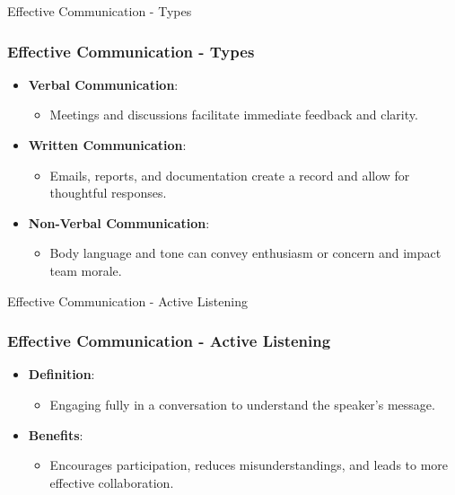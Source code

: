 \documentclass[aspectratio=169]{beamer}
\begin{document}
\begin{frame}[fragile]{Effective Communication - Types}
    \frametitle{Effective Communication - Types}
    \begin{itemize}
        \item \textbf{Verbal Communication}:
            \begin{itemize}
                \item Meetings and discussions facilitate immediate feedback and clarity.
            \end{itemize}
        \item \textbf{Written Communication}:
            \begin{itemize}
                \item Emails, reports, and documentation create a record and allow for thoughtful responses.
            \end{itemize}
        \item \textbf{Non-Verbal Communication}:
            \begin{itemize}
                \item Body language and tone can convey enthusiasm or concern and impact team morale.
            \end{itemize}
    \end{itemize}
\end{frame}

\begin{frame}[fragile]{Effective Communication - Active Listening}
    \frametitle{Effective Communication - Active Listening}
    \begin{itemize}
        \item \textbf{Definition}:
            \begin{itemize}
                \item Engaging fully in a conversation to understand the speaker's message.
            \end{itemize}
        \item \textbf{Benefits}:
            \begin{itemize}
                \item Encourages participation, reduces misunderstandings, and leads to more effective collaboration.
            \end{itemize}
    \end{itemize}
\end{frame}
\end{document}
